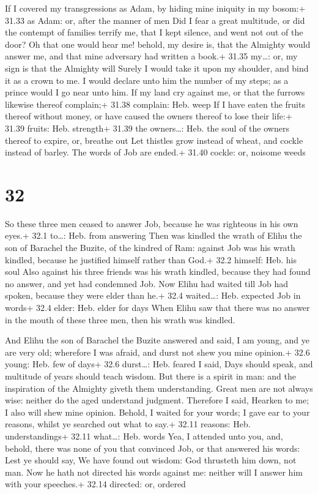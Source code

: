  If I covered my transgressions as Adam, by hiding mine
iniquity in my bosom:+ 31.33 as Adam: or, after the manner of men
 Did I fear a great multitude, or did the contempt of
families terrify me, that I kept silence, and went not out of the door?
 Oh that one would hear me! behold, my desire is, that the
Almighty would answer me, and that mine adversary had written a book.+
31.35 my\ldots: or, my sign is that the Almighty will 
Surely I would take it upon my shoulder, and bind it as a crown to me.
 I would declare unto him the number of my steps; as a
prince would I go near unto him.  If my land cry against
me, or that the furrows likewise thereof complain;+ 31.38 complain: Heb.
weep  If I have eaten the fruits thereof without money, or
have caused the owners thereof to lose their life:+ 31.39 fruits: Heb.
strength+ 31.39 the owners\ldots: Heb. the soul of the owners thereof to
expire, or, breathe out  Let thistles grow instead of
wheat, and cockle instead of barley. The words of Job are ended.+ 31.40
cockle: or, noisome weeds

\hypertarget{section-31}{%
\section{32}\label{section-31}}

 So these three men ceased to answer Job, because he was
righteous in his own eyes.+ 32.1 to\ldots: Heb. from answering
 Then was kindled the wrath of Elihu the son of Barachel the
Buzite, of the kindred of Ram: against Job was his wrath kindled,
because he justified himself rather than God.+ 32.2 himself: Heb. his
soul  Also against his three friends was his wrath kindled,
because they had found no answer, and yet had condemned Job.
 Now Elihu had waited till Job had spoken, because they were
elder than he.+ 32.4 waited\ldots: Heb. expected Job in words+ 32.4
elder: Heb. elder for days  When Elihu saw that there was no
answer in the mouth of these three men, then his wrath was kindled.

 And Elihu the son of Barachel the Buzite answered and said,
I am young, and ye are very old; wherefore I was afraid, and durst not
shew you mine opinion.+ 32.6 young: Heb. few of days+ 32.6 durst\ldots:
Heb. feared  I said, Days should speak, and multitude of
years should teach wisdom.  But there is a spirit in man:
and the inspiration of the Almighty giveth them understanding.
 Great men are not always wise: neither do the aged
understand judgment.  Therefore I said, Hearken to me; I
also will shew mine opinion.  Behold, I waited for your
words; I gave ear to your reasons, whilst ye searched out what to say.+
32.11 reasons: Heb. understandings+ 32.11 what\ldots: Heb. words
 Yea, I attended unto you, and, behold, there was none of
you that convinced Job, or that answered his words:  Lest
ye should say, We have found out wisdom: God thrusteth him down, not
man.  Now he hath not directed his words against me:
neither will I answer him with your speeches.+ 32.14 directed: or,
ordered

